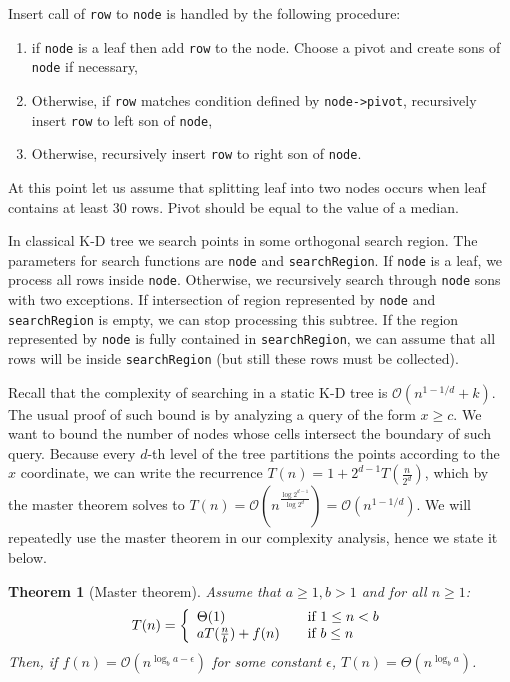 \documentclass[10pt,a4paper]{article}
\newtheorem{theorem}{Theorem}
\newcommand{\Oh}{\mathcal{O}}
\begin{document}
Insert call of \verb|row| to \verb|node| is handled by the following procedure:

\begin{enumerate}
\item if \verb|node| is a leaf then add \verb|row| to the node. Choose a pivot and create sons of \verb|node| if necessary,
\item Otherwise, if \verb|row| matches condition defined by \verb|node->pivot|, recursively insert \verb|row| to left son of \verb|node|,
\item Otherwise, recursively insert \verb|row| to right son of \verb|node|.
\end{enumerate}

At this point let us assume that splitting leaf into two nodes occurs when leaf contains at least 30 rows. Pivot should be equal to the value of a median.

In classical K-D tree we search points in some orthogonal search region. The parameters for search functions are \verb|node| and \verb|searchRegion|. If \verb|node| is a leaf, we process all rows inside \verb|node|. Otherwise, we recursively search through \verb|node| sons with two exceptions. If intersection of region represented by \verb|node| and \verb|searchRegion| is empty, we can stop processing this subtree. If the region represented by \verb|node| is fully contained in \verb|searchRegion|, we can assume that all rows will be inside \verb|searchRegion| (but still these rows must be collected).

Recall that the complexity of searching in a static K-D tree is $\Oh(n^{1-1/d} + k)$. The usual proof of such bound is by analyzing a query of the form $x \geq c$. We want to bound the number of nodes whose cells intersect the boundary of such query. Because every $d$-th level of the tree partitions the points according to the $x$ coordinate, we can write the recurrence $T(n)=1+2^{d-1}T(\frac{n}{2^{d}})$, which by the master theorem solves to $T(n)=\Oh(n^{\frac{\log 2^{d-1}}{\log 2^{d}}})=\Oh(n^{1-1/d})$. We will repeatedly use the master theorem in our complexity analysis, hence we state it below.

\begin{theorem}[Master theorem]
Assume that $a \geq 1, b > 1$ and for all $n\geq 1$:
\[
  T(n) = \left\{ 
  \begin{array}{l l}
    \Theta(1) & \quad \text{if $1 \leq n < b$}\\
    a T(\frac{n}{b}) + f(n) & \quad \text{if $b \leq n$ }\\
  \end{array} \right.
\]
Then, if $f(n)=\Oh(n^{{\log_{b}{a}} - \epsilon})$ for some constant $\epsilon$, $T(n) = \Theta(n^{\log_{b}{a}})$.
\end{theorem}
\end{document}
